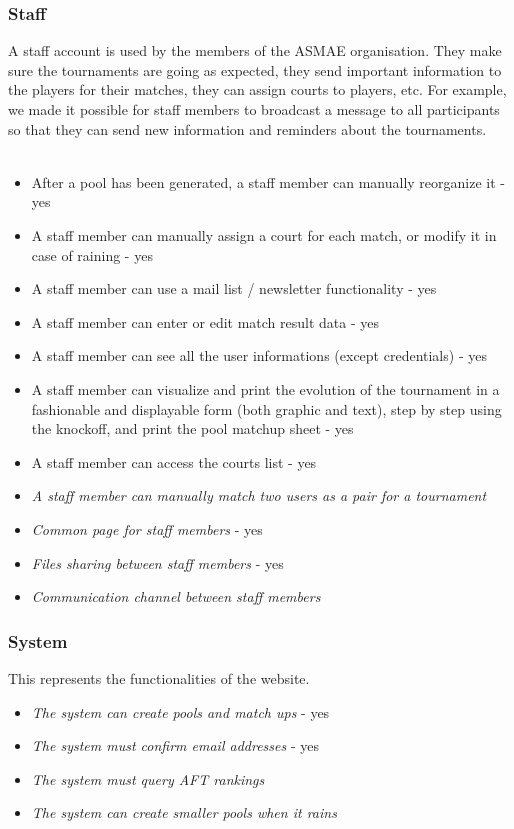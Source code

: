 \documentclass[a4paper, 12pt]{article}
\begin{document}
\subsubsection*{Staff} 
    A staff account is used by the members of the ASMAE organisation. They make sure the tournaments are going as expected, they send important information to the players for their matches, they can assign courts to players, etc. For example, we made it possible for staff members to  broadcast a message to all participants so that they can send new information and reminders about the tournaments.\\\\
    
    \begin{itemize}
    	\item After a pool has been generated, a staff member can manually reorganize it - yes
		\item A staff member can manually assign a court for each match, or modify it in case of raining - yes
		\item A staff member can use a mail list / newsletter functionality - yes
		\item A staff member can enter or edit match result data - yes
		\item A staff member can see all the user informations (except credentials) - yes
		\item A staff member can visualize and print the evolution of the tournament in a fashionable and displayable form (both graphic and text), step by step using the knockoff, and print the pool matchup sheet - yes
		\item A staff member can access the courts list - yes
		\item \textit{A staff member can manually match two users as a pair for a tournament}
		\item \textit{Common page for staff members} - yes
		\item \textit{Files sharing between staff members} - yes
		\item \textit{Communication channel between staff members}
    \end{itemize}
    
\subsubsection*{System}   
     This represents the functionalities of the website.
    \begin{itemize}
    	\item \textit{The system can create pools and match ups} - yes
		\item \textit{The system must confirm email addresses} - yes
		\item \textit{The system must query AFT rankings}
		\item \textit{The system can create smaller pools when it rains}
    \end{itemize}
    
\end{document}
